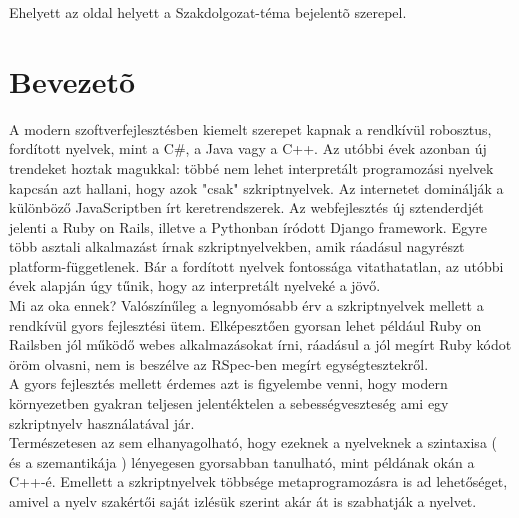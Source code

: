 \documentclass[a4paper,12pt]{report}
\begin{document}
\renewcommand\lstlistingname{Algoritmus}
\renewcommand\lstlistlistingname{Algoritmusok}





\vspace*{\fill}
\begin{center}
Ehelyett az oldal helyett a Szakdolgozat-téma bejelentõ szerepel.
\end{center}
\vfill
\thispagestyle{empty}
\newpage
\setcounter{page}{1}


\tableofcontents



\chapter{Bevezetõ}

A modern szoftverfejlesztésben kiemelt szerepet kapnak a rendkívül robosztus, fordított nyelvek, mint a C\#, a Java vagy a C++. Az utóbbi évek azonban új trendeket hoztak magukkal: többé nem lehet interpretált programozási nyelvek kapcsán azt hallani, hogy azok "csak" szkriptnyelvek. Az internetet dominálják a különböző JavaScriptben írt keretrendszerek. Az webfejlesztés új sztenderdjét jelenti a Ruby on Rails, illetve a Pythonban íródott Django framework. Egyre több asztali alkalmazást írnak szkriptnyelvekben, amik ráadásul nagyrészt platform-függetlenek. Bár a fordított nyelvek fontossága vitathatatlan, az utóbbi évek alapján úgy tűnik, hogy az interpretált nyelveké a jövő. \\

Mi az oka ennek? Valószínűleg a legnyomósabb érv a szkriptnyelvek mellett a rendkívül gyors fejlesztési ütem. Elképesztően gyorsan lehet például Ruby on Railsben jól működő webes alkalmazásokat írni, ráadásul a jól megírt Ruby kódot öröm olvasni, nem is beszélve az RSpec-ben megírt egységtesztekről. \\
A gyors fejlesztés mellett érdemes azt is figyelembe venni, hogy modern környezetben gyakran teljesen jelentéktelen a sebességveszteség ami egy szkriptnyelv használatával jár. \\
Természetesen az sem elhanyagolható, hogy ezeknek a nyelveknek a szintaxisa ( és a szemantikája ) lényegesen gyorsabban tanulható, mint példának okán a C++-é. Emellett a szkriptnyelvek többsége metaprogramozásra is ad lehetőséget, amivel a nyelv szakértői saját izlésük szerint akár át is szabhatják a nyelvet.
\\
\end{document}
